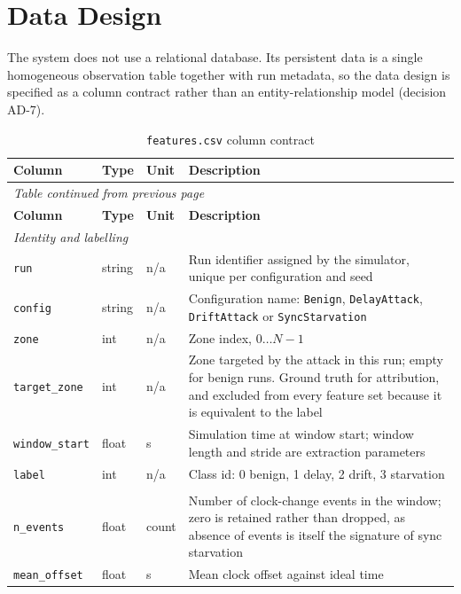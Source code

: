 \section{Data Design}
\label{sec:data-design}

The system does not use a relational database. Its persistent data is a single
homogeneous observation table together with run metadata, so the data design is
specified as a column contract rather than an entity-relationship model (decision
AD-7).

\begin{longtable}{p{} p{} p{} p{}}
\caption{\texttt{features.csv} column contract}\label{tab:schema}\\
\toprule
\textbf{Column} & \textbf{Type} & \textbf{Unit} & \textbf{Description} \\
\midrule
\endfirsthead
\multicolumn{4}{l}{\textit{Table \thetable{} continued from previous page}}\\
\toprule
\textbf{Column} & \textbf{Type} & \textbf{Unit} & \textbf{Description} \\
\midrule
\endhead
\multicolumn{4}{l}{\textit{Identity and labelling}}\\
\texttt{run} & string & n/a & Run identifier assigned by the simulator, unique per
configuration and seed \\
\texttt{config} & string & n/a & Configuration name: \texttt{Benign},
\texttt{DelayAttack}, \texttt{DriftAttack} or \texttt{SyncStarvation} \\
\texttt{zone} & int & n/a & Zone index, $0 \ldots N-1$ \\
\texttt{target\_zone} & int & n/a & Zone targeted by the attack in this run; empty for
benign runs. Ground truth for attribution, and excluded from every feature set because
it is equivalent to the label \\
\texttt{window\_start} & float & s & Simulation time at window start; window length and
stride are extraction parameters \\
\texttt{label} & int & n/a & Class id: 0 benign, 1 delay, 2 drift, 3 starvation \\
\addlinespace
\multicolumn{4}{l}{\textit{Zone-controller features, prefix} \texttt{ctrl\_}}\\
\texttt{n\_events} & float & count & Number of clock-change events in the window; zero
is retained rather than dropped, as absence of events is itself the signature of sync
starvation \\
\texttt{mean\_offset} & float & s & Mean clock offset against ideal time \\

\end{longtable}
